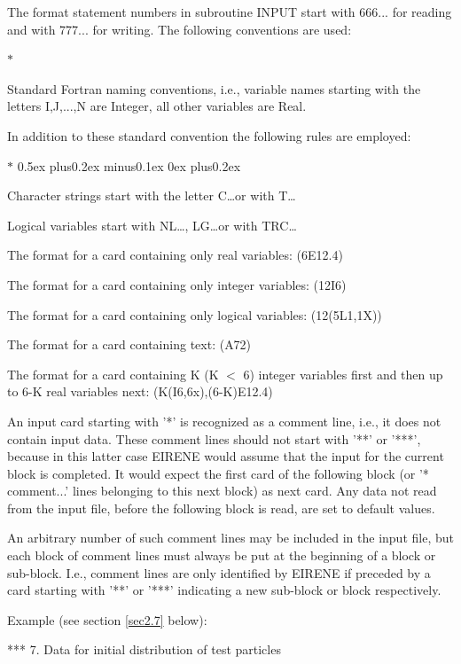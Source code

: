 The format statement numbers in subroutine INPUT
start with 666... for reading and with
777... for writing. The following conventions are used:
\begin{list}{$ * $}{}
\item Standard Fortran naming conventions, i.e., variable names starting
with the letters I,J,...,N are Integer, all other variables
are Real.
\end{list}
In addition to these standard convention the following rules
are employed:
\begin{list}{$ * $}{
\parsep0.5ex plus0.2ex minus0.1ex \itemsep0ex plus0.2ex}
\item Character strings start with the letter C\dots or with T\dots
\item Logical variables start with NL\dots, LG\dots or with TRC\dots
\end{list}
The format for a card containing only real variables: (6E12.4)

The format for a card containing only integer variables: (12I6)

The format for a card containing only logical variables: (12(5L1,1X))

The format for a card containing text: (A72)

The format for a card containing K (K $<$ 6)
integer variables first
and then up to 6-K real
variables next: (K(I6,6x),(6-K)E12.4)

An input card starting with '*' is recognized as a comment line,
i.e., it does not contain input data.
These comment lines should not start
with  '**' or '***', because
in this latter case EIRENE would assume that the input for the current
block
is completed. It would expect the first card of the following
block (or '* comment...' lines belonging to this next block)
as next card. Any data not read from the input file, before
the following block is read, are set to default values.

An arbitrary number
of such comment lines may be included
in the input file, but each block of comment lines must always
be put at the beginning of a block or sub-block. I.e., comment lines
are only identified by EIRENE if preceded by a card starting with
'**' or '***' indicating a new sub-block or block respectively.

\medskip

Example (see section \ref{sec2.7} below):

*** 7. Data for initial distribution of test particles

